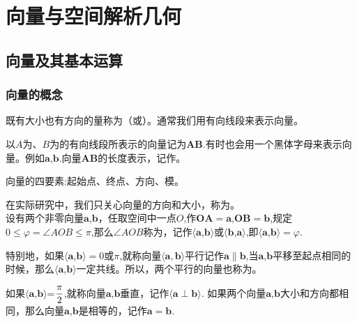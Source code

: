 \chapter{向量与空间解析几何}
\section{向量及其基本运算}
\subsection{向量的概念}
既有大小也有方向的量称为（或）。通常我们用有向线段来表示向量。
\par 以$A$为、$B$为的有向线段所表示的向量记为$\boldsymbol{AB}$.有时也会用一个黑体字母来表示向量。例如$\boldsymbol{a}$,$\boldsymbol{b}$.向量$\boldsymbol{AB}$的长度表示，记作。
\par 向量的四要素:起始点、终点、方向、模。

在实际研究中，我们只关心向量的方向和大小，称为。\\

\sj
{}
设有两个非零向量$\boldsymbol{a}$,$\boldsymbol{b}$，任取空间中一点$O$,作$\boldsymbol{OA}=\boldsymbol{a}$,$\boldsymbol{OB}=\boldsymbol{b}$,规定$0\leq \varphi=\angle AOB\leq \pi$,那么$\angle AOB$称为，记作$\langle\boldsymbol{a}$,$\boldsymbol{b}\rangle$或$\langle\boldsymbol{b}$,$\boldsymbol{a}\rangle$,即$\langle\boldsymbol{a}$,$\boldsymbol{b}\rangle=\varphi$.
\par 特别地，如果$\langle\boldsymbol{a}$,$\boldsymbol{b}\rangle=0$或$\pi$,就称向量$\langle\boldsymbol{a},\boldsymbol{b}
\rangle$平行记作$\boldsymbol{a}\parallel\boldsymbol{b}$,当$\boldsymbol{a}$,$\boldsymbol{b}$平移至起点相同的时候，那么$\langle\boldsymbol{a}$,$\boldsymbol{b}\rangle$一定共线。所以，两个平行的向量也称为。
\par 如果$\langle\boldsymbol{a}$,$\boldsymbol{b}\rangle$=$\displaystyle\frac{\pi}{2}$,就称向量$\boldsymbol{a}$,$\boldsymbol{b}$垂直，记作$\langle\boldsymbol{a}\perp\boldsymbol{b}\rangle$.
如果两个向量$\boldsymbol{a}$,$\boldsymbol{b}$大小和方向都相同，那么向量$\boldsymbol{a}$,$\boldsymbol{b}$是相等的，记作$\boldsymbol{a}=\boldsymbol{b}$.\\

